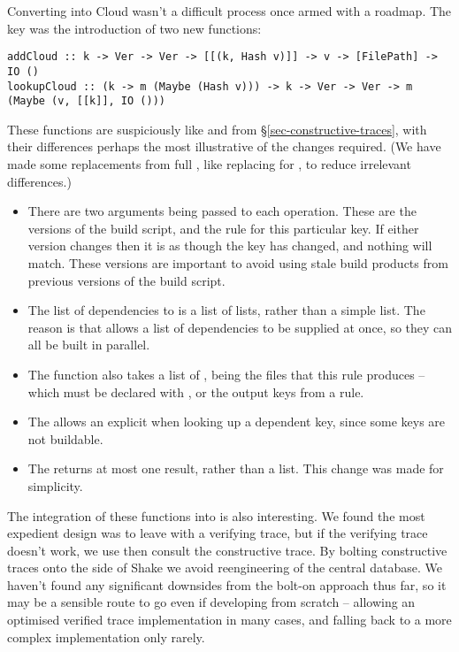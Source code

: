 Converting \Shake into Cloud \Shake wasn't a difficult process once armed with a roadmap. The key was the introduction of two new functions:

\begin{verbatim}
addCloud :: k -> Ver -> Ver -> [[(k, Hash v)]] -> v -> [FilePath] -> IO ()
lookupCloud :: (k -> m (Maybe (Hash v))) -> k -> Ver -> Ver -> m (Maybe (v, [[k]], IO ()))
\end{verbatim}

These functions are suspiciously like  and  from \S\ref{sec-constructive-traces}, with their differences perhaps the most illustrative of the changes required. (We have made some replacements from full \Shake, like replacing  for , to reduce irrelevant differences.)

\begin{itemize}
\item There are two  arguments being passed to each operation. These are the versions of the build script, and the rule for this particular key. If either version changes then it is as though the key has changed, and nothing will match. These versions are important to avoid using stale build products from previous versions of the build script.
\item The list of dependencies to  is a list of lists, rather than a simple list. The reason is that \Shake allows a list of dependencies to be supplied at once, so they can all be built in parallel.
\item The  function also takes a list of , being the files that this rule produces -- which must be declared with , or the output keys from a rule.
\item The  allows an explicit  when looking up a dependent key, since some keys are not buildable.
\item The  returns at most one result, rather than a list. This change was made for simplicity.
\end{itemize}

The integration of these functions into \Shake is also interesting. We found the most expedient design was to leave \Shake with a verifying trace, but if the verifying trace doesn't work, we use then consult the constructive trace. By bolting constructive traces onto the side of Shake we avoid reengineering of the central database. We haven't found any significant downsides from the bolt-on approach thus far, so it may be a sensible route to go even if developing from scratch -- allowing an optimised verified trace implementation in many cases, and falling back to a more complex implementation only rarely.

